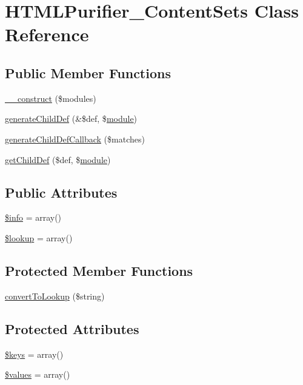 \hypertarget{classHTMLPurifier__ContentSets}{\section{H\+T\+M\+L\+Purifier\+\_\+\+Content\+Sets Class Reference}
\label{classHTMLPurifier__ContentSets}
}
\subsection*{Public Member Functions}
\begin{DoxyCompactItemize}
\item 
\hyperlink{classHTMLPurifier__ContentSets_a12957e0bba5ab35c64f1c8cc0913ae1a}{\+\_\+\+\_\+construct} (\$modules)
\item 
\hyperlink{classHTMLPurifier__ContentSets_a7e9735f0448fd1b7b6ee75e1b1c29655}{generate\+Child\+Def} (\&\$def, \$\hyperlink{classmodule}{module})
\item 
\hyperlink{classHTMLPurifier__ContentSets_a51ad5b6f1eda70280950d26694969ec2}{generate\+Child\+Def\+Callback} (\$matches)
\item 
\hyperlink{classHTMLPurifier__ContentSets_a6800a7ac4aacdbf050c0b17a0564d7b6}{get\+Child\+Def} (\$def, \$\hyperlink{classmodule}{module})
\end{DoxyCompactItemize}
\subsection*{Public Attributes}
\begin{DoxyCompactItemize}
\item 
\hyperlink{classHTMLPurifier__ContentSets_a59146cf7fed870a194f1459fc3291329}{\$info} = array()
\item 
\hyperlink{classHTMLPurifier__ContentSets_a4edc2744f4c253f1958ccae6a8894c5f}{\$lookup} = array()
\end{DoxyCompactItemize}
\subsection*{Protected Member Functions}
\begin{DoxyCompactItemize}
\item 
\hyperlink{classHTMLPurifier__ContentSets_a7d70a53edcd7b107f1961053edf1eeef}{convert\+To\+Lookup} (\$string)
\end{DoxyCompactItemize}
\subsection*{Protected Attributes}
\begin{DoxyCompactItemize}
\item 
\hyperlink{classHTMLPurifier__ContentSets_abf3eac7ddc8ffaddea9a6cc5d599a69c}{\$keys} = array()
\item 
\hyperlink{classHTMLPurifier__ContentSets_a60b13361a83f3b845d8e1af0719333fe}{\$values} = array()
\end{DoxyCompactItemize}


